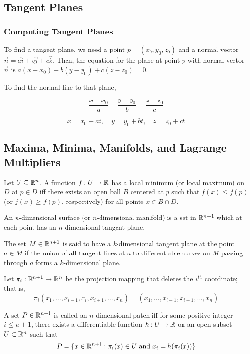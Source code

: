 \subsection{Tangent Planes}

\subsubsection{Computing Tangent Planes}

To find a tangent plane, we need a point $p = (x_0, y_{0}, z_{0})$ and a normal vector $\vec{n} = a\hat{i} + b\hat{j} + c\hat{k}$. Then, the equation for the plane at point $p$ with normal vector $\vec{n}$ is $a(x - x_{0}) + b(y - y_{0}) + c(z - z_{0})=0$.

To find the normal line to that plane,

$$\frac{x - x_0}{a} = \frac{y - y_0}{b} = \frac{z - z_0}{c}$$

$$x = x_0 + at, \quad y = y_0 + bt, \quad z = z_0 + ct$$


\subsection{Maxima, Minima, Manifolds, and Lagrange Multipliers}

Let $U \subseteq \mathbb{R}^n$. A function $f : U \to \mathbb{R}$ has a local minimum (or local maximum) on $D$ at $p \in D$ iff there exists an open ball $B$ centered at $p$ such that $f(x) \leq f(p)$ (or $f(x) \geq f(p)$, respectively) for all points $x \in B \cap D$.

An $n$-dimensional surface (or $n$-dimensional manifold) is a set in $\mathbb{R}^{n+1}$ which at each point has an $n$-dimensional tangent plane.

The set $M \in \mathbb{R}^{n+1}$ is said to have a $k$-dimensional tangent plane at the point $a \in M$ if the union of all tangent lines at $a$ to differentiable curves on $M$ passing through $a$ forms a $k$-dimensional plane.

Let $\pi_i : \mathbb{R}^{n+1} \to \mathbb{R}^n$ be the projection mapping that deletes the $i^{th}$ coordinate; that is, $$\pi_i(x_1, \ldots, x_{i - 1}, x_i, x_{i+1}, \ldots, x_n) = (x_1, \ldots, x_{i - 1}, x_{i+1}, \ldots, x_n)$$

A set $P \in \mathbb{R}^{n+1}$ is called an $n$-dimensional patch iff for some positive integer $i \leq n + 1$, there exists a differentiable function $h : U \to \mathbb{R}$ on an open subset $U \subset \mathbb{R}^n$ such that $$P = \{ x \in \mathbb{R}^{n+1} : \pi_i(x) \in U \text{ and } x_i = h(\pi_i(x))\} $$

